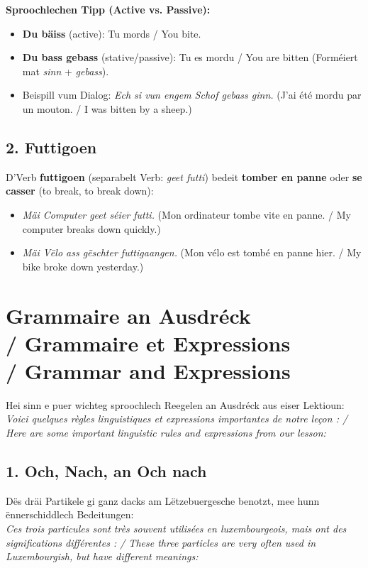 \vspace{0.5em}
\noindent\textbf{Sproochlechen Tipp (Active vs. Passive):}
\begin{itemize}
    \item \textbf{Du bäiss} (active): Tu mords / You bite.
    \item \textbf{Du bass gebass} (stative/passive): Tu es mordu / You are bitten (Forméiert mat \textit{sinn} + \textit{gebass}).
    \item Beispill vum Dialog: \textit{Ech si vun engem Schof gebass ginn.} (J'ai été mordu par un mouton. / I was bitten by a sheep.)
\end{itemize}

\subsection*{2. Futtigoen}
D'Verb \textbf{futtigoen} (separabelt Verb: \textit{geet futti}) bedeit \textbf{tomber en panne} oder \textbf{se casser} (to break, to break down):
\begin{itemize}
    \item \textit{Mäi Computer geet séier futti.} (Mon ordinateur tombe vite en panne. / My computer breaks down quickly.)
    \item \textit{Mäi Vëlo ass gëschter futtigaangen.} (Mon vélo est tombé en panne hier. / My bike broke down yesterday.)
\end{itemize}

\vspace{1cm}

\section[Grammaire an Ausdréck / Grammaire / Grammar]{Grammaire an Ausdréck \\/ Grammaire et Expressions \\/ Grammar and Expressions}

Hei sinn e puer wichteg sproochlech Reegelen an Ausdréck aus eiser Lektioun: \\
\textit{Voici quelques règles linguistiques et expressions importantes de notre leçon : / Here are some important linguistic rules and expressions from our lesson:}

\subsection*{1. Och, Nach, an Och nach}
Dës dräi Partikele gi ganz dacks am Lëtzebuergesche benotzt, mee hunn ënnerschiddlech Bedeitungen: \\
\textit{Ces trois particules sont très souvent utilisées en luxembourgeois, mais ont des significations différentes : / These three particles are very often used in Luxembourgish, but have different meanings:}

